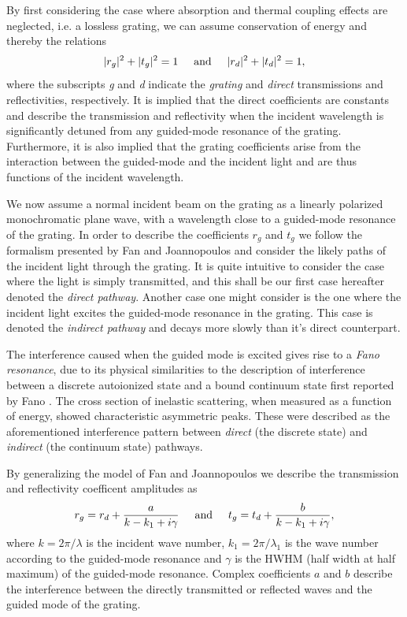 By first considering the case where absorption and thermal coupling effects are neglected, i.e. a lossless grating, we can assume conservation of energy and thereby the relations
\begin{equation}
    |r_g|^2+|t_g|^2=1 \hspace{0.5cm} \text{and} \hspace{0.5cm} |r_d|^2+|t_d|^2=1,
    \label{eq:energy conservation}
\end{equation}
where the subscripts \emph{g} and \emph{d} indicate the \emph{grating} and \emph{direct} transmissions and reflectivities, respectively. It is implied that the direct coefficients are constants and describe the transmission and reflectivity when the incident wavelength is significantly detuned from any guided-mode resonance of the grating. Furthermore, it is also implied that the grating coefficients arise from the interaction between the guided-mode and the incident light and are thus functions of the incident wavelength.

We now assume a normal incident beam on the grating as a linearly polarized monochromatic plane wave, with a wavelength close to a guided-mode resonance of the grating. In order to describe the coefficients $r_g$ and $t_g$ we follow the formalism presented by Fan and Joannopoulos \cite{Fan-Joannopoulos-guided-mode-resonance} and consider the likely paths of the incident light through the grating. It is quite intuitive to consider the case where the light is simply transmitted, and this shall be our first case hereafter denoted the \emph{direct pathway}. Another case one might consider is the one where the incident light excites the guided-mode resonance in the grating. This case is denoted the \emph{indirect pathway} and decays more slowly than it's direct counterpart. 

The interference caused when the guided mode is excited gives rise to a \emph{Fano resonance}, due to its physical similarities to the description of interference between a discrete autoionized state and a bound continuum state first reported by Fano \cite{Fano-theory}. The cross section of inelastic scattering, when measured as a function of energy, showed characteristic asymmetric peaks. These were described as the aforementioned interference pattern between \emph{direct} (the discrete state) and \emph{indirect} (the continuum state) pathways. 

By generalizing the model of Fan and Joannopoulos \cite{Fan-Joannopoulos-guided-mode-resonance} we describe the transmission and reflectivity coefficent amplitudes as 
\begin{equation}
    r_g = r_d + \frac{a}{k-k_1 + i\gamma} \hspace{0.5cm} \text{and} \hspace{0.5cm} t_g = t_d + \frac{b}{k-k_1+i\gamma},
    \label{eq:ref/trans}
\end{equation}
where $k=2\pi/\lambda$ is the incident wave number, $k_1 = 2\pi/\lambda_1$ is the wave number according to the guided-mode resonance and $\gamma$ is the HWHM (half width at half maximum) of the guided-mode resonance. Complex coefficients $a$ and $b$ describe the interference between the directly transmitted or reflected waves and the guided mode of the grating. 

